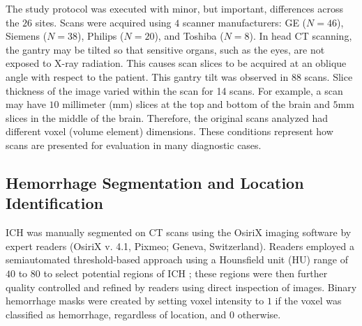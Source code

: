 \documentclass{elsarticle_nonatbib}\usepackage[]{graphicx}\usepackage[]{color}
\begin{document}
The study protocol was executed with minor, but important, differences across the $26$ sites.  Scans were acquired using $4$ scanner manufacturers: GE ($N=46$),  Siemens ($N=38$),  Philips ($N=20$),  and Toshiba ($N=8$).   In head CT scanning, the gantry may be tilted so that sensitive organs, such as the eyes, are not exposed to X-ray radiation.  This causes scan slices to be acquired at an oblique angle with respect to the patient.  This gantry tilt was observed in $88$ scans.
Slice thickness of the image varied within the scan for 14 scans.
For example, a scan may have $10$ millimeter (mm) slices at the top and bottom of the brain and $5$mm slices in the middle of the brain.  Therefore, the original scans analyzed had different voxel (volume element) dimensions.  These conditions represent how scans are presented for evaluation in many diagnostic cases.



\subsection{Hemorrhage Segmentation and Location Identification}
ICH was manually segmented on CT scans using the OsiriX imaging software by expert readers (OsiriX v. 4.1, Pixmeo; Geneva, Switzerland).  Readers employed a semiautomated threshold-based approach using a Hounsfield unit (HU) range of $40$ to $80$ to select potential regions of ICH \citep{bergstrom_variation_1977, smith_imaging_2006}; these regions were then further quality controlled and refined by readers using direct inspection of images.  Binary hemorrhage masks were created by setting voxel intensity to $1$ if the voxel was classified as hemorrhage, regardless of location, and $0$ otherwise.  
\end{document}
